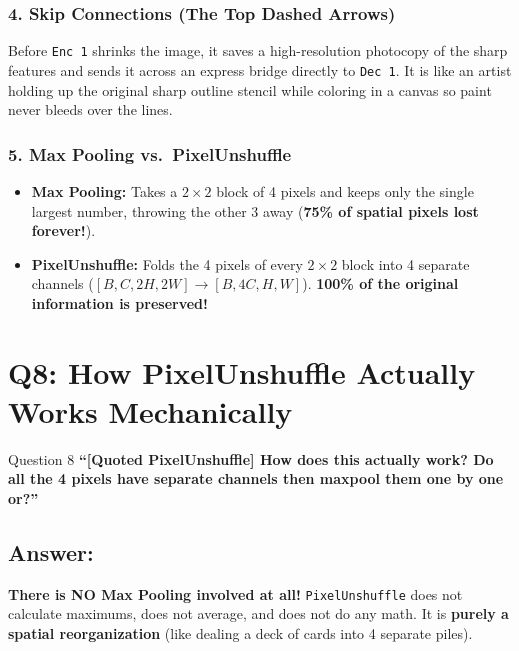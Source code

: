 \documentclass[11pt,a4paper]{article}
\begin{document}
\subsubsection*{4. Skip Connections (The Top Dashed Arrows)}
Before \texttt{Enc 1} shrinks the image, it saves a high-resolution photocopy of the sharp features and sends it across an express bridge directly to \texttt{Dec 1}. It is like an artist holding up the original sharp outline stencil while coloring in a canvas so paint never bleeds over the lines.

\subsubsection*{5. Max Pooling vs.\ PixelUnshuffle}
\begin{itemize}[leftmargin=1.5em]
    \item \textbf{Max Pooling:} Takes a $2\times 2$ block of 4 pixels and keeps only the single largest number, throwing the other 3 away (\textbf{75\% of spatial pixels lost forever!}).
    \item \textbf{PixelUnshuffle:} Folds the 4 pixels of every $2\times 2$ block into 4 separate channels ($[B, C, 2H, 2W] \to [B, 4C, H, W]$). \textbf{100\% of the original information is preserved!}
\end{itemize}

\bigskip

\section{Q8: How PixelUnshuffle Actually Works Mechanically}

\begin{questionbox}{Question 8}
\textbf{``[Quoted PixelUnshuffle] How does this actually work? Do all the 4 pixels have separate channels then maxpool them one by one or?''}
\end{questionbox}

\subsection*{Answer:}
\textbf{There is NO Max Pooling involved at all!} \texttt{PixelUnshuffle} does not calculate maximums, does not average, and does not do any math. It is \textbf{purely a spatial reorganization} (like dealing a deck of cards into 4 separate piles).
\end{document}
